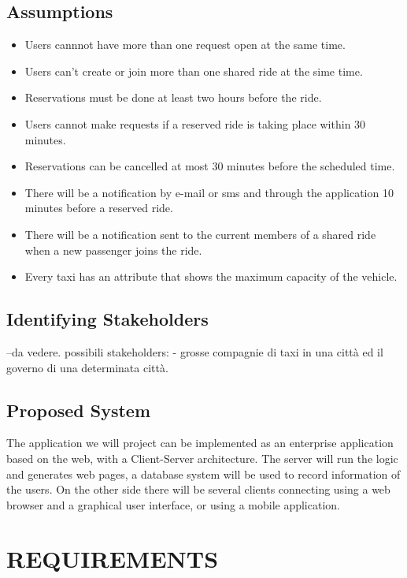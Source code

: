 \documentclass[a4paper, 12pt, titlepage]{article}
\begin{document}
\subsection{Assumptions}
\begin{itemize}
	\item Users cannnot have more than one request open at the same time.
	\item Users can't create or join more than one shared ride at the sime time.
	\item Reservations must be done at least two hours before the ride.
	\item Users cannot make requests if a reserved ride is taking place within 30 minutes.
	\item Reservations can be cancelled at most 30 minutes before the scheduled time.
	\item There will be a notification by e-mail or sms and through the application 10 minutes before a reserved ride.
	\item There will be a notification sent to  the current members of a shared ride when a new passenger joins the ride.
	\item Every taxi has an attribute that shows the maximum capacity of the vehicle.
\end{itemize}

\subsection{Identifying Stakeholders}

--da vedere. possibili stakeholders: - grosse compagnie di taxi in una città ed il governo di una determinata città.

\subsection{Proposed System}
The application we will project can be implemented as an enterprise application based on the web, with a Client-Server architecture. The server will run the logic and generates web pages, a database system will be used to record information of the users. On the other side there will be several clients connecting using a web browser and a graphical user interface, or using a mobile application.	

\newpage

\section{REQUIREMENTS}
\end{document}
